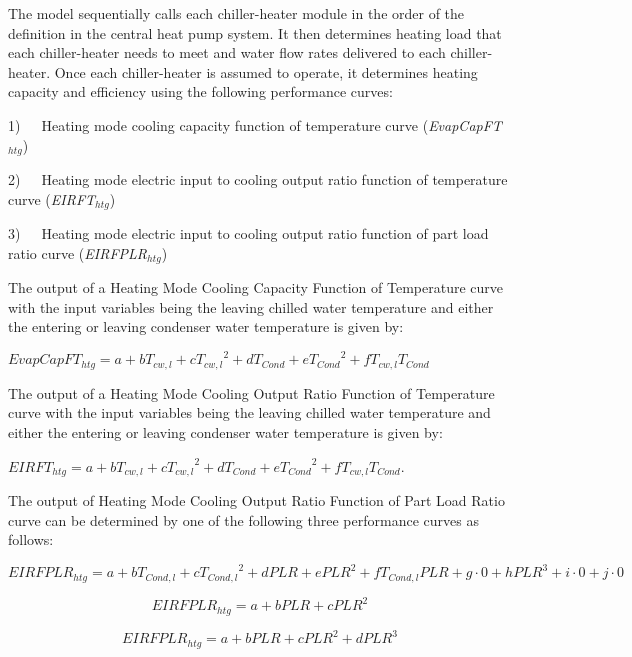 The model sequentially calls each chiller-heater module in the order of the definition in the central heat pump system. It then determines heating load that each chiller-heater needs to meet and water flow rates delivered to each chiller-heater. Once each chiller-heater is assumed to operate, it determines heating capacity and efficiency using the following performance curves:

1)~~~Heating mode cooling capacity function of temperature curve (\emph{EvapCapFT\(_{htg}\)})

2)~~~Heating mode electric input to cooling output ratio function of temperature curve (\emph{EIRFT\(_{htg}\)})

3)~~~Heating mode electric input to cooling output ratio function of part load ratio curve (\emph{EIRFPLR\(_{htg}\)})

The output of a Heating Mode Cooling Capacity Function of Temperature curve with the input variables being the leaving chilled water temperature and either the entering or leaving condenser water temperature is given by:

\textbf{\emph{\(EvapCapF{T_{htg}} = a + b{T_{cw,l}} + c{T_{cw,l}}^2 + d{T_{Cond}} + e{T_{Cond}}^2 + f{T_{cw,l}}{T_{Cond}}\)}}

The output of a Heating Mode Cooling Output Ratio Function of Temperature curve with the input variables being the leaving chilled water temperature and either the entering or leaving condenser water temperature is given by:

\textbf{\emph{\(EIRF{T_{htg}} = a + b{T_{cw,l}} + c{T_{cw,l}}^2 + d{T_{Cond}} + e{T_{Cond}}^2 + f{T_{cw,l}}{T_{Cond}}\)}}.

The output of Heating Mode Cooling Output Ratio Function of Part Load Ratio curve can be determined by one of the following three performance curves as follows:

\begin{equation}
EIRFPL{R_{htg}} = a + b{T_{Cond,l}} + c{T_{Cond,l}}^2 + dPLR + ePL{R^2} + f{T_{Cond,l}}PLR + g \cdot 0 + hPL{R^3} + i \cdot 0 + j \cdot 0
\end{equation}

\begin{equation}
EIRFPL{R_{htg}} = a + bPLR + cPL{R^2}
\end{equation}

\begin{equation}
EIRFPL{R_{htg}} = a + bPLR + cPL{R^2} + dPL{R^3}
\end{equation}

